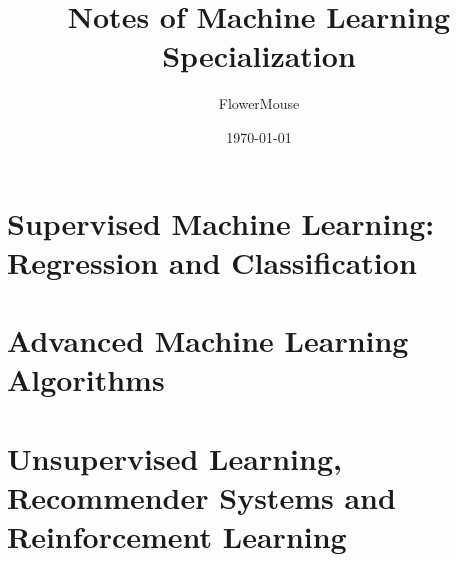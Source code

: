 \documentclass[math,code]{amznotes}
\title{Notes of Machine Learning Specialization}
\author{FlowerMouse}
\date{\today}
\begin{document}
    \frontmatter
    \maketitle
    \thispagestyle{empty}
    
    \tableofcontents

    \mainmatter
    \part{Supervised Machine Learning: \\ Regression and Classification}
    
    
    
    
    
    
    
    \part{Advanced Machine Learning Algorithms}
    
    
    
    
    \part{Unsupervised Learning, \\Recommender Systems and\\ Reinforcement Learning}
    
    
    
    
    
    
    
    
    \backmatter
    \amzindex
\end{document}
